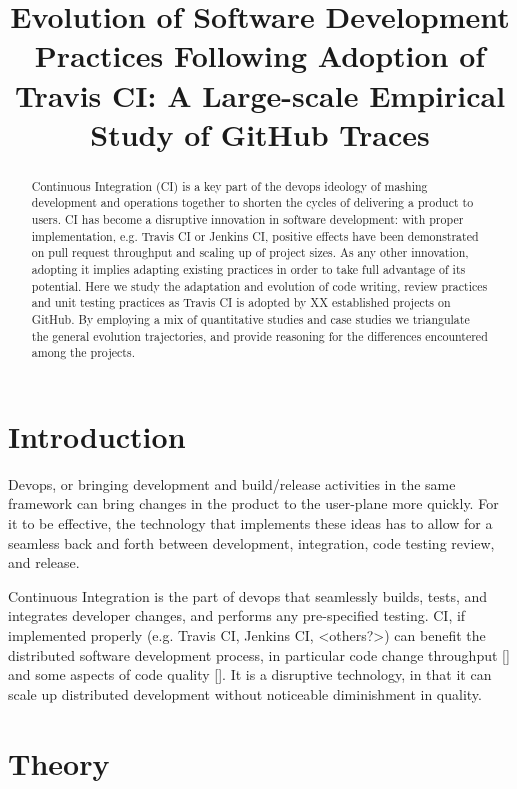 \documentclass[conference]{IEEEtran}
\begin{document}
\title{Evolution of Software Development Practices
Following Adoption of Travis CI: A Large-scale Empirical Study of GitHub Traces}

\author
{\IEEEauthorblockN{}
\IEEEauthorblockA{}
}
\maketitle
\begin{abstract}
Continuous Integration (CI) is a key part of the devops ideology of mashing development and operations together to shorten the cycles of delivering a product to users. CI has become a disruptive innovation in software development: with proper implementation, e.g. Travis CI or Jenkins CI, positive effects have been demonstrated on pull request throughput and scaling up of project sizes. As any other innovation, adopting it implies adapting existing practices in order to take full advantage of its potential. Here we study the adaptation and evolution of code writing, review practices and unit testing practices as Travis CI is adopted by XX established projects on GitHub. By employing a mix of quantitative studies and case studies we triangulate the general evolution trajectories, and provide reasoning for the differences encountered among the projects.
\end{abstract}

\section{Introduction}
Devops, or bringing development and build/release activities in the same framework can bring changes in the product to the user-plane more quickly. For it to be effective, the technology that implements these ideas has to allow for a seamless back and forth between development, integration, code testing review, and release. 

Continuous Integration is the part of devops that seamlessly builds, tests, and integrates developer changes, and performs any pre-specified testing. CI, if implemented properly (e.g. Travis CI, Jenkins CI, <others?>) can benefit the distributed software development process, in particular code change throughput [] and some aspects of code quality []. It is a disruptive technology, in that it can scale up distributed development without noticeable diminishment in quality.

\section{Theory}
\end{document}

